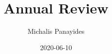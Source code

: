 \documentclass{beamer}
\title{\Large{Annual Review}}
\author{Michalis Panayides}
\date{2020-06-10}
\begin{document}
\frame{\titlepage}




\end{document}
